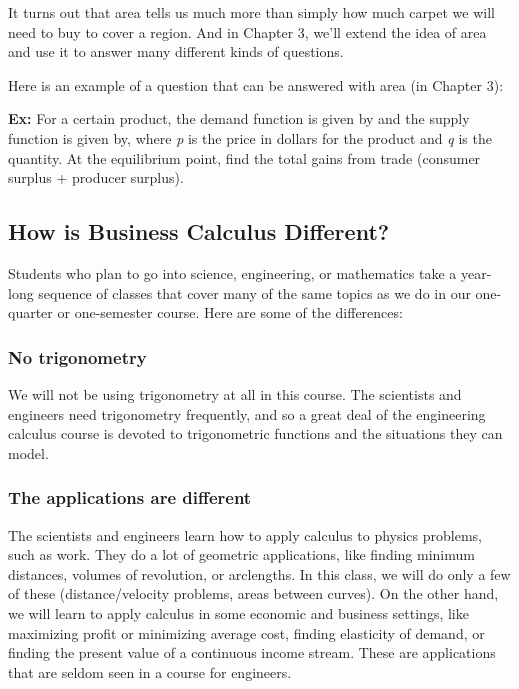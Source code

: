 It turns out that area tells us much more than simply how much carpet we
will need to buy to cover a region. And in Chapter 3, we'll extend the
idea of area and use it to answer many different kinds of questions.

Here is an example of a question that can be answered with area (in
Chapter 3):

\textbf{Ex:} For a certain product, the demand function is given by and
the supply function is given by, where \emph{p} is the price in dollars
for the product and \emph{q} is the quantity. At the equilibrium point,
find the total gains from trade (consumer surplus + producer surplus).

\hypertarget{how-is-business-calculus-different}{\subsection{How is
Business Calculus Different?}\label{how-is-business-calculus-different}}

Students who plan to go into science, engineering, or mathematics take a
year-long sequence of classes that cover many of the same topics as we
do in our one-quarter or one-semester course. Here are some of the
differences:

\subsubsection{No trigonometry }\label{no-trigonometry}

We will not be using trigonometry at all in this course. The scientists
and engineers need trigonometry frequently, and so a great deal of the
engineering calculus course is devoted to trigonometric functions and
the situations they can model.

\subsubsection{The applications are
different}\label{the-applications-are-different}

The scientists and engineers learn how to apply calculus to physics
problems, such as work. They do a lot of geometric applications, like
finding minimum distances, volumes of revolution, or arclengths. In this
class, we will do only a few of these (distance/velocity problems, areas
between curves). On the other hand, we will learn to apply calculus in
some economic and business settings, like maximizing profit or
minimizing average cost, finding elasticity of demand, or finding the
present value of a continuous income stream. These are applications that
are seldom seen in a course for engineers.

